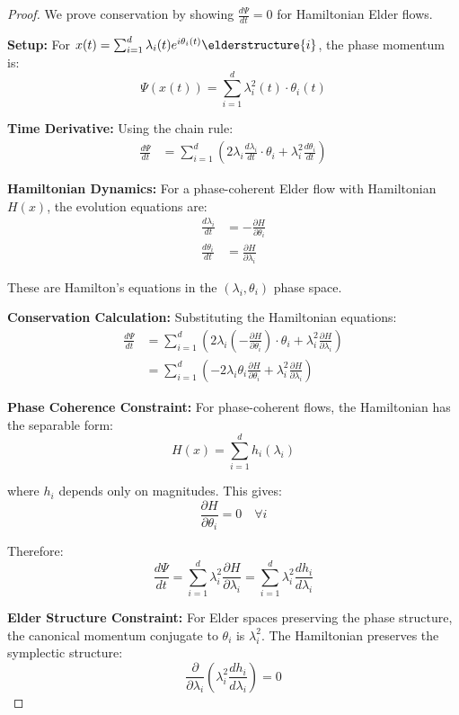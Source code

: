 \begin{proof}
We prove conservation by showing $\frac{d\Psi}{dt} = 0$ for Hamiltonian Elder flows.

\textbf{Setup:}
For $x(t) = \sum_{i=1}^{d} \lambda_i(t) e^{i\theta_i(t)} \elderstructure{i}$, the phase momentum is:
$$\Psi(x(t)) = \sum_{i=1}^{d} \lambda_i^2(t) \cdot \theta_i(t)$$

\textbf{Time Derivative:}
Using the chain rule:
\begin{align}
\frac{d\Psi}{dt} &= \sum_{i=1}^{d} \left(2\lambda_i \frac{d\lambda_i}{dt} \cdot \theta_i + \lambda_i^2 \frac{d\theta_i}{dt}\right)
\end{align}

\textbf{Hamiltonian Dynamics:}
For a phase-coherent Elder flow with Hamiltonian $H(x)$, the evolution equations are:
\begin{align}
\frac{d\lambda_i}{dt} &= -\frac{\partial H}{\partial \theta_i} \\
\frac{d\theta_i}{dt} &= \frac{\partial H}{\partial \lambda_i}
\end{align}

These are Hamilton's equations in the $(\lambda_i, \theta_i)$ phase space.

\textbf{Conservation Calculation:}
Substituting the Hamiltonian equations:
\begin{align}
\frac{d\Psi}{dt} &= \sum_{i=1}^{d} \left(2\lambda_i \left(-\frac{\partial H}{\partial \theta_i}\right) \cdot \theta_i + \lambda_i^2 \frac{\partial H}{\partial \lambda_i}\right) \\
&= \sum_{i=1}^{d} \left(-2\lambda_i \theta_i \frac{\partial H}{\partial \theta_i} + \lambda_i^2 \frac{\partial H}{\partial \lambda_i}\right)
\end{align}

\textbf{Phase Coherence Constraint:}
For phase-coherent flows, the Hamiltonian has the separable form:
$$H(x) = \sum_{i=1}^{d} h_i(\lambda_i)$$

where $h_i$ depends only on magnitudes. This gives:
$$\frac{\partial H}{\partial \theta_i} = 0 \quad \forall i$$

Therefore:
$$\frac{d\Psi}{dt} = \sum_{i=1}^{d} \lambda_i^2 \frac{\partial H}{\partial \lambda_i} = \sum_{i=1}^{d} \lambda_i^2 \frac{dh_i}{d\lambda_i}$$

\textbf{Elder Structure Constraint:}
For Elder spaces preserving the phase structure, the canonical momentum conjugate to $\theta_i$ is $\lambda_i^2$. The Hamiltonian preserves the symplectic structure:
$$\frac{\partial}{\partial \lambda_i}\left(\lambda_i^2 \frac{dh_i}{d\lambda_i}\right) = 0$$


\end{proof}
